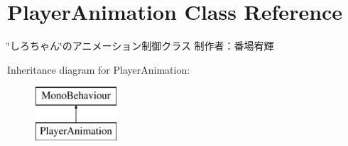 \hypertarget{class_player_animation}{}\section{Player\+Animation Class Reference}
\label{class_player_animation}


\char`\"{}しろちゃん\char`\"{}のアニメーション制御クラス 制作者：番場宥輝  


Inheritance diagram for Player\+Animation\+:\begin{figure}[H]
\begin{center}
\leavevmode
\includegraphics[height=2.000000cm]{class_player_animation}
\end{center}
\end{figure}
